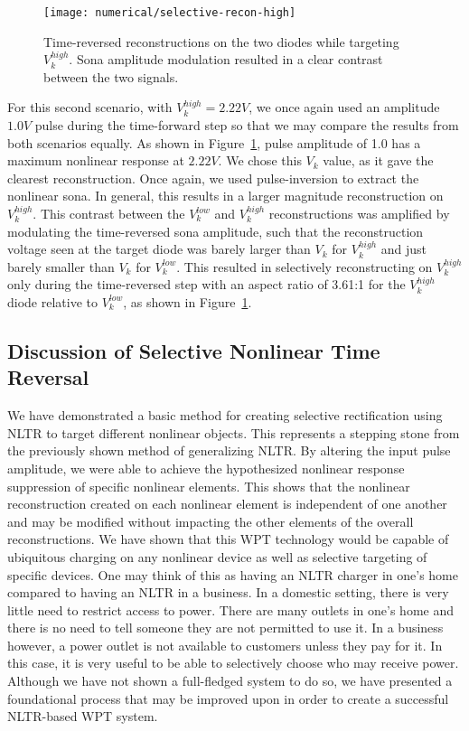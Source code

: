 \begin{figure}[t]
\centering
\texttt{[image: numerical/selective-recon-high]}
\caption[Selective reconstruction on a $V_{k}^{high}$ diode]{Time-reversed reconstructions on the two diodes while targeting $V_{k}^{high}$. Sona amplitude modulation resulted in a clear contrast between the two signals.}
\label{fig:numerical-selective-recon-high}
\end{figure}

For this second scenario, with $V_k^{high} = 2.22V$, we once again used an amplitude $1.0 V$ pulse during the time-forward step so that we may compare the results from both scenarios equally. As shown in Figure~\ref{fig:numerical-selective-recon-high}, pulse amplitude of 1.0 has a maximum nonlinear response at $2.22V$. We chose this $V_k$ value, as it gave the clearest reconstruction. Once again, we used pulse-inversion to extract the nonlinear sona. In general, this results in a larger magnitude reconstruction on $V_k^{high}$. This contrast between the $V_k^{low}$ and $V_k^{high}$ reconstructions was amplified by modulating the time-reversed sona amplitude, such that the reconstruction voltage seen at the target diode was barely larger than $V_k$ for $V_k^{high}$ and just barely smaller than $V_k$ for $V_k^{low}$. This resulted in selectively reconstructing on $V_k^{high}$ only during the time-reversed step with an aspect ratio of 3.61:1 for the $V_k^{high}$  diode relative to $V_k^{low}$, as shown in Figure~\ref{fig:numerical-selective-recon-high}.

\subsection{Discussion of Selective Nonlinear Time Reversal}

We have demonstrated a basic method for creating selective rectification using NLTR to target different nonlinear objects. This represents a stepping stone from the previously shown method of generalizing NLTR. By altering the input pulse amplitude, we were able to achieve the hypothesized nonlinear response suppression of specific nonlinear elements. This shows that the nonlinear reconstruction created on each nonlinear element is independent of one another and may be modified without impacting the other elements of the overall reconstructions. We have shown that this WPT technology would be capable of ubiquitous charging on any nonlinear device as well as selective targeting of specific devices. One may think of this as having an NLTR charger in one's home compared to having an NLTR in a business. In a domestic setting, there is very little need to restrict access to power. There are many outlets in one's home and there is no need to tell someone they are not permitted to use it. In a business however, a power outlet is not available to customers unless they pay for it. In this case, it is very useful to be able to selectively choose who may receive power. Although we have not shown a full-fledged system to do so, we have presented a foundational process that may be improved upon in order to create a successful NLTR-based WPT system.

